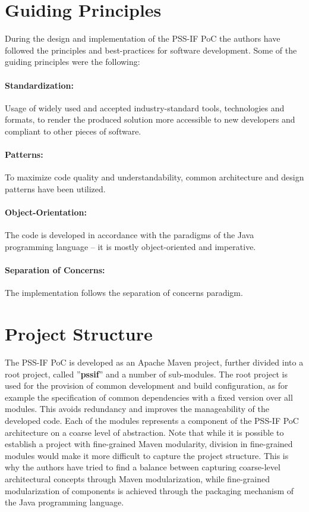 \section{Guiding Principles}
\label{sec:impl:principles}

During the design and implementation of the PSS-IF PoC the authors have followed the principles and best-practices for software development. Some of the guiding principles were the following:

\paragraph{Standardization:} Usage of widely used and accepted industry-standard tools, technologies and formats, to render the produced solution more accessible to new developers and compliant to other pieces of software.

\paragraph{Patterns:} To maximize code quality and understandability, common architecture and design patterns have been utilized.

\paragraph{Object-Orientation:} The code is developed in accordance with the paradigms of the Java programming language -- it is mostly object-oriented and imperative.

\paragraph{Separation of Concerns:} The implementation follows the separation of concerns paradigm.

\section{Project Structure}
\label{sec:impl:structure}

The PSS-IF PoC is developed as an Apache Maven project, further divided into a root project, called ''\textbf{pssif}'' and a number of sub-modules. The root project is used for the provision of common development and  build configuration, as for example the specification of common dependencies with a fixed version over all modules. This avoids redundancy and improves the manageability of the developed code. Each of the modules represents a component of the PSS-IF PoC architecture on a coarse level of abstraction. Note that while it is possible to establish a project with fine-grained Maven modularity, division in fine-grained modules would make it more difficult to capture the project structure. This is why the authors have tried to find a balance between capturing coarse-level architectural concepts through Maven modularization, while fine-grained modularization of components is achieved through the packaging mechanism of the Java programming language.

